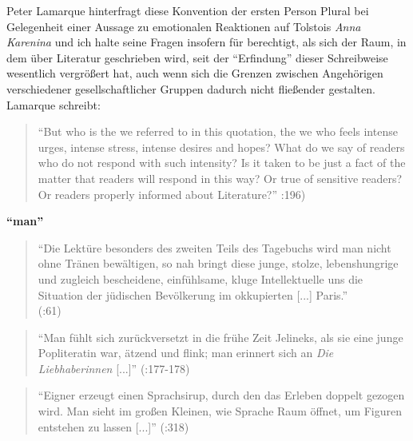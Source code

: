 \documentclass[fontsize=12pt]{scrartcl}
\begin{document}
Peter Lamarque hinterfragt diese Konvention der ersten Person Plural bei Gelegenheit einer Aussage zu emotionalen Reaktionen auf Tolstois \textit{Anna Karenina} und ich halte seine Fragen insofern f\"ur berechtigt, als sich der Raum, in dem \"uber Li\-te\-ra\-tur geschrieben wird, seit der "`Erfindung"' dieser Schreibweise we\-sent\-lich vergr\"o{\ss}ert hat, auch wenn sich die Grenzen zwischen Angeh\"origen verschiedener ge\-sell\-schaftlicher Gruppen dadurch nicht flie{\ss}ender gestalten. Lamarque schreibt:

\singlespacing
\begin{quote}
"`But who is the \flq we\frq\,\,referred to in this quotation, the \flq we\frq\,\,who feels intense urges, intense stress, intense desires and hopes? What do we say of readers who do not respond with such intensity? Is it taken to be just a fact of the matter that readers will respond in this way? Or true of sensitive readers? Or readers properly informed about Li\-te\-ra\-ture?"' \cite{Lamarque2014}:196)
\end{quote}
\onehalfspacing










\textbf{"`man"'}

\singlespacing
\begin{quote}
"`Die Lekt\"ure besonders des zwei\-ten Teils des Tagebuchs wird man nicht ohne Tr\"anen bew\"altigen, so nah bringt diese junge, stolze, lebenshungrige und zugleich bescheidene, einf\"uhlsame, kluge Intellektuelle uns die Situation der j\"udischen Bev\"olkerung im okkupierten [...] Paris."'\\ (\cite{Hartwig2012}:61)\end{quote}
\onehalfspacing

\singlespacing
\begin{quote}
"`Man f\"uhlt sich zur\"uckversetzt in die fr\"uhe Zeit Jelineks, als sie eine junge Popliteratin war, \"atzend und flink; man erinnert sich an \textit{Die Liebhaberinnen} [...]"' (\cite{Hartwig2012}:177-178)
\end{quote}
\onehalfspacing


\singlespacing
\begin{quote}
"`Eigner erzeugt einen Sprachsirup, durch den das Erleben doppelt gezogen wird. Man sieht im gro{\ss}en Kleinen, wie Sprache Raum \"offnet, um Figuren entstehen zu lassen [...]"' (\cite{Draesner2013}:318)
\end{quote}
\onehalfspacing
\end{document}
